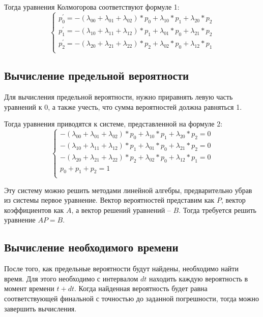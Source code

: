 Тогда уравнения Колмогорова соответствуют формуле 1:
\begin{equation}
	\begin{cases}
		p^{'}_{0} = -(\lambda_{00}+\lambda_{01}+\lambda_{02})*p_0 + \lambda_{10}*p_1 + \lambda_{20}*p_2 \\
		p^{'}_{1} = -(\lambda_{10}+\lambda_{11}+\lambda_{12})*p_1 + \lambda_{01}*p_0 + \lambda_{21}*p_2 \\
		p^{'}_{2} = -(\lambda_{20}+\lambda_{21}+\lambda_{22})*p_2 + \lambda_{02}*p_0 + \lambda_{12}*p_1 \\
	\end{cases}
\end{equation}

\subsection*{Вычисление предельной вероятности}

Для вычисления предельной вероятности, нужно приравнять левую часть уравнений к 0, а также учесть, что сумма вероятностей должна равняться 1.

Тогда уравнения приводятся к системе, представленной на формуле 2:
\begin{equation}
	\begin{cases}
		-(\lambda_{00}+\lambda_{01}+\lambda_{02})*p_0 + \lambda_{10}*p_1 + \lambda_{20}*p_2  = 0\\
		-(\lambda_{10}+\lambda_{11}+\lambda_{12})*p_1 + \lambda_{01}*p_0 + \lambda_{21}*p_2 = 0 \\
		-(\lambda_{20}+\lambda_{21}+\lambda_{22})*p_2 + \lambda_{02}*p_0 + \lambda_{12}*p_1 = 0 \\
		p_{0} + p_{1} + p_{2} = 1 \\
  	\end{cases}
\end{equation}

Эту систему можно решить методами линейной алгебры, предварительно убрав из системы первое уравнение.
Вектор вероятностей представим как $P$, вектор коэффициентов как $A$, а вектор решений уравнений -- $B$. 
Тогда требуется решить уравнение $AP = B$.

\subsection*{Вычисление необходимого времени}
После того, как предельные вероятности будут найдены, необходимо найти время. 
Для этого необходимо с интервалом $dt$ находить каждую вероятность в момент времени $t + dt$. 
Когда найденная вероятность будет равна соответствующей финальной с точностью до заданной погрешности, тогда можно завершить вычисления. 

